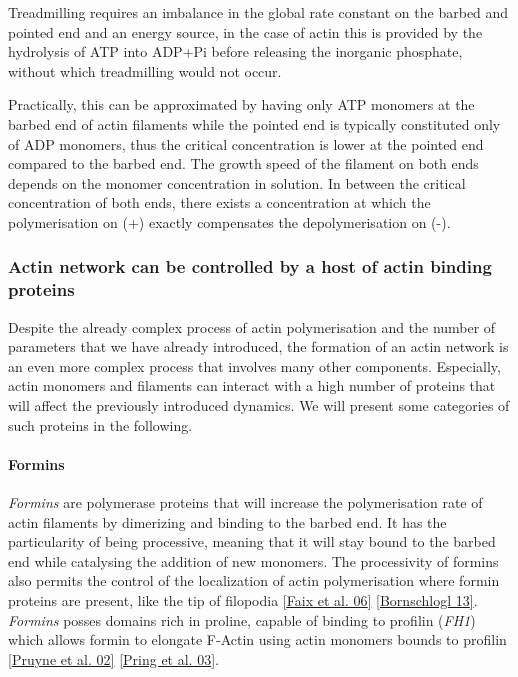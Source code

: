 \documentclass[A4paperpaper,11pt,english]{sphinxmanual}
\begin{document}
Treadmilling requires an imbalance in the global rate constant on the barbed and
pointed end and an energy source, in the case of actin this is provided by the
hydrolysis of ATP into ADP+Pi before releasing the inorganic phosphate, without
which treadmilling would not occur.

Practically, this can be approximated by having only ATP monomers at the barbed
end of actin filaments while the pointed end is typically constituted only of
ADP monomers, thus the critical concentration is lower at the  pointed end
compared to the barbed end. The growth speed of the filament on both
ends depends on the monomer concentration in solution. In between the
critical concentration of both ends, there exists a concentration at which the
polymerisation on (+) exactly compensates the depolymerisation on (-).


\subsubsection{Actin network can be controlled by a host of actin binding proteins}
\label{index-latex:actin-network-can-be-controlled-by-a-host-of-actin-binding-proteins}
Despite the already complex process of actin polymerisation and the
number of parameters that we have already introduced, the formation of an actin
network is an even more complex process that involves many other components.
Especially, actin monomers and filaments can interact with a high number of
proteins that will affect the previously introduced dynamics.  We will present
some categories of such proteins in the following.


\paragraph{Formins}
\label{index-latex:formins}
\emph{Formins} are polymerase proteins that will increase the polymerisation rate
of actin filaments by dimerizing and binding to the barbed end. It has the
particularity of being processive, meaning that it will stay bound to the
barbed end while catalysing the addition of new monomers. The processivity of
formins also permits the control of the localization of actin polymerisation
where formin proteins are present, like the tip of filopodia {\hyperref[index-latex:faix2006]{{[}Faix et al. 06{]}}}
{\hyperref[index-latex:bornschlogl2013]{{[}Bornschlogl 13{]}}}. \emph{Formins} posses domains rich in proline, capable of
binding to profilin (\emph{FH1}) which allows formin to elongate F-Actin using actin
monomers bounds to profilin {\hyperref[index-latex:pruyne2002]{{[}Pruyne et al. 02{]}}} {\hyperref[index-latex:pring2003a]{{[}Pring et al. 03{]}}}.
\end{document}
